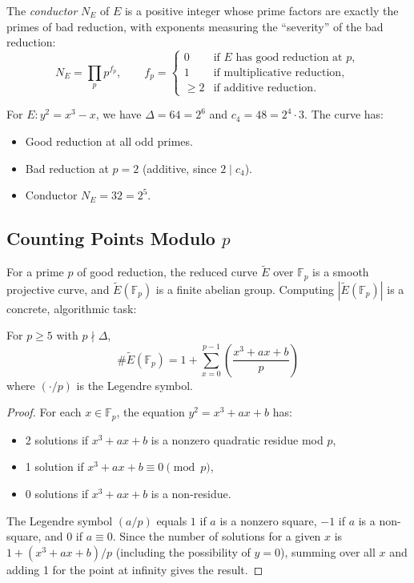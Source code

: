The \emph{conductor} $N_E$ of $E$ is a positive integer whose prime factors are exactly the primes of bad reduction, with exponents measuring the ``severity'' of the bad reduction:
\[
N_E = \prod_{p} p^{f_p}, \qquad f_p = \begin{cases} 0 & \text{if } E \text{ has good reduction at } p, \\ 1 & \text{if multiplicative reduction}, \\ \ge 2 & \text{if additive reduction}. \end{cases}
\]

\begin{example}
For $E: y^2 = x^3 - x$, we have $\Delta = 64 = 2^6$ and $c_4 = 48 = 2^4 \cdot 3$. The curve has:
\begin{itemize}
\item Good reduction at all odd primes.
\item Bad reduction at $p = 2$ (additive, since $2 \mid c_4$).
\item Conductor $N_E = 32 = 2^5$.
\end{itemize}
\end{example}

\subsection{Counting Points Modulo $p$}

For a prime $p$ of good reduction, the reduced curve $\widetilde{E}$ over $\mathbb{F}_p$ is a smooth projective curve, and $\widetilde{E}(\mathbb{F}_p)$ is a finite abelian group. Computing $|\widetilde{E}(\mathbb{F}_p)|$ is a concrete, algorithmic task:

\begin{proposition}
For $p \ge 5$ with $p \nmid \Delta$,
\[
\#\widetilde{E}(\mathbb{F}_p) = 1 + \sum_{x=0}^{p-1} \left(\frac{x^3 + ax + b}{p}\right)
\]
where $(\cdot/p)$ is the Legendre symbol.
\end{proposition}

\begin{proof}
For each $x \in \mathbb{F}_p$, the equation $y^2 = x^3 + ax + b$ has:
\begin{itemize}
\item 2 solutions if $x^3 + ax + b$ is a nonzero quadratic residue mod $p$,
\item 1 solution if $x^3 + ax + b \equiv 0 \pmod{p}$,
\item 0 solutions if $x^3 + ax + b$ is a non-residue.
\end{itemize}
The Legendre symbol $(a/p)$ equals $1$ if $a$ is a nonzero square, $-1$ if $a$ is a non-square, and $0$ if $a \equiv 0$. Since the number of solutions for a given $x$ is $1 + (x^3 + ax + b)/p$ (including the possibility of $y = 0$), summing over all $x$ and adding 1 for the point at infinity gives the result.
\end{proof}

